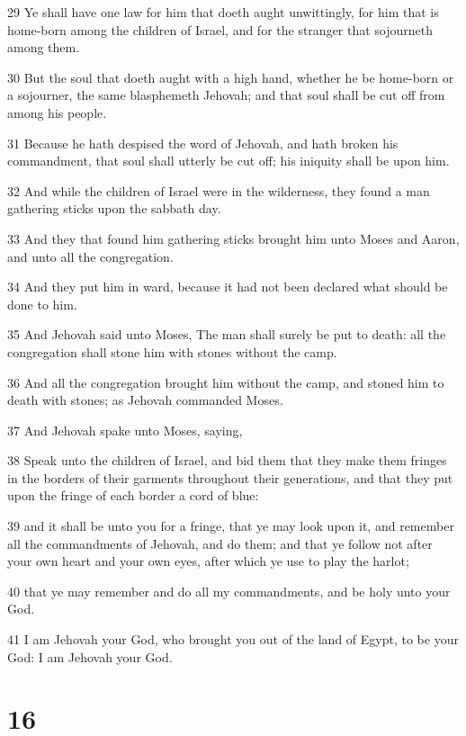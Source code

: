 \par 29 Ye shall have one law for him that doeth aught unwittingly, for him that is home-born among the children of Israel, and for the stranger that sojourneth among them.
\par 30 But the soul that doeth aught with a high hand, whether he be home-born or a sojourner, the same blasphemeth Jehovah; and that soul shall be cut off from among his people.
\par 31 Because he hath despised the word of Jehovah, and hath broken his commandment, that soul shall utterly be cut off; his iniquity shall be upon him.
\par 32 And while the children of Israel were in the wilderness, they found a man gathering sticks upon the sabbath day.
\par 33 And they that found him gathering sticks brought him unto Moses and Aaron, and unto all the congregation.
\par 34 And they put him in ward, because it had not been declared what should be done to him.
\par 35 And Jehovah said unto Moses, The man shall surely be put to death: all the congregation shall stone him with stones without the camp.
\par 36 And all the congregation brought him without the camp, and stoned him to death with stones; as Jehovah commanded Moses.
\par 37 And Jehovah spake unto Moses, saying,
\par 38 Speak unto the children of Israel, and bid them that they make them fringes in the borders of their garments throughout their generations, and that they put upon the fringe of each border a cord of blue:
\par 39 and it shall be unto you for a fringe, that ye may look upon it, and remember all the commandments of Jehovah, and do them; and that ye follow not after your own heart and your own eyes, after which ye use to play the harlot;
\par 40 that ye may remember and do all my commandments, and be holy unto your God.
\par 41 I am Jehovah your God, who brought you out of the land of Egypt, to be your God: I am Jehovah your God.

\chapter{16}

